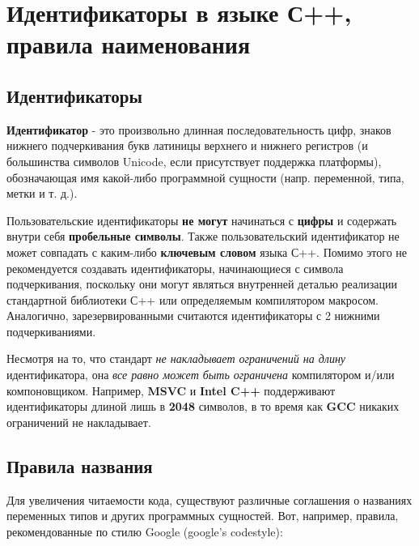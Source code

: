 \section{Идентификаторы в языке С++, правила
наименования}\label{ux438ux434ux435ux43dux442ux438ux444ux438ux43aux430ux442ux43eux440ux44b-ux432-ux44fux437ux44bux43aux435-ux441-ux43fux440ux430ux432ux438ux43bux430-ux43dux430ux438ux43cux435ux43dux43eux432ux430ux43dux438ux44f}

\subsection{Идентификаторы}\label{ux438ux434ux435ux43dux442ux438ux444ux438ux43aux430ux442ux43eux440ux44b}

\textbf{Идентификатор} - это произвольно длинная последовательность
цифр, знаков нижнего подчеркивания букв латиницы верхнего и нижнего
регистров (и большинства символов Unicode, если присутствует поддержка
платформы), обозначающая имя какой-либо программной сущности (напр.
переменной, типа, метки и т. д.).

Пользовательские идентификаторы \textbf{не могут} начинаться с
\textbf{цифры} и содержать внутри себя \textbf{пробельные символы}.
Также пользовательский идентификатор не может совпадать с каким-либо
\textbf{ключевым словом} языка С++. Помимо этого не рекомендуется
создавать идентификаторы, начинающиеся с символа подчеркивания,
поскольку они могут являться внутренней деталью реализации стандартной
библиотеки С++ или определяемым компилятором макросом. Аналогично,
зарезервированными считаются идентификаторы с 2 нижними подчеркиваниями.

Несмотря на то, что стандарт \emph{не накладывает ограничений на длину}
идентификатора, она \emph{все равно может быть ограничена} компилятором
и/или компоновщиком. Например, \textbf{MSVC} и \textbf{Intel C++}
поддерживают идентификаторы длиной лишь в \textbf{2048} символов, в то
время как \textbf{GCC} никаких ограничений не накладывает.

\subsection{Правила
названия}\label{ux43fux440ux430ux432ux438ux43bux430-ux43dux430ux437ux432ux430ux43dux438ux44f}

Для увеличения читаемости кода, существуют различные соглашения о
названиях переменных типов и других программных сущностей. Вот,
например, правила, рекомендованные по стилю Google (google's codestyle):

